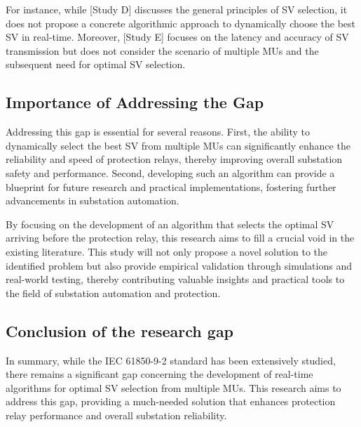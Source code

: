 For instance, while [Study D] discusses the general principles of SV selection, it does not propose a concrete algorithmic approach to dynamically choose the best SV in real-time. Moreover, [Study E] focuses on the latency and accuracy of SV transmission but does not consider the scenario of multiple MUs and the subsequent need for optimal SV selection.

\subsection{Importance of Addressing the Gap}

Addressing this gap is essential for several reasons. First, the ability to dynamically select the best SV from multiple MUs can significantly enhance the reliability and speed of protection relays, thereby improving overall substation safety and performance. Second, developing such an algorithm can provide a blueprint for future research and practical implementations, fostering further advancements in substation automation.

By focusing on the development of an algorithm that selects the optimal SV arriving before the protection relay, this research aims to fill a crucial void in the existing literature. This study will not only propose a novel solution to the identified problem but also provide empirical validation through simulations and real-world testing, thereby contributing valuable insights and practical tools to the field of substation automation and protection.

\subsection{Conclusion of the research gap}

In summary, while the IEC 61850-9-2 standard has been extensively studied, there remains a significant gap concerning the development of real-time algorithms for optimal SV selection from multiple MUs. This research aims to address this gap, providing a much-needed solution that enhances protection relay performance and overall substation reliability.

